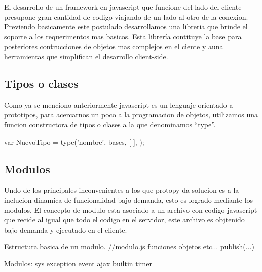 El desarrollo de un framework en javascript que funcione del lado del cliente presupone gran cantidad de codigo
viajando de un lado al otro de la conexion. Previendo basicamente este postulado desarrollamos una libreria
que brinde el soporte a los requerimentos mas basicos.
Esta librería contituye la base para posteriores contrucciones de objetos mas complejos en el ciente y
auna herramientas que simplifican el desarrollo client-side.

\subsection*{Tipos o clases}
Como ya se menciono anteriormente javascript es un lenguaje orientado a prototipos, para acercarnos un poco a la programacion
de objetos, utilizamos una funcion constructora de tipos o clases a la que denominamos “type”.

var NuevoTipo = type('nombre', bases, [ {} ], {});

\subsection*{Modulos}
Undo de los principales inconvenientes a los que protopy da solucion es a la inclucion dinamica de funcionalidad bajo demanda,
esto es logrado mediante los modulos.
El concepto de modulo esta asociado a un archivo con codigo javascript que recide al igual que todo el codigo en el servidor,
este archivo es objtenido bajo demanda y ejecutado en el cliente.

Estructura basica de un modulo.
	//modulo.js
	funciones
	objetos
	etc...
	publish(...)


Modulos:
	sys
	exception
	event
	ajax
	builtin
	timer